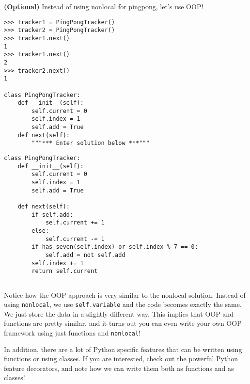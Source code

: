 \question \textbf{(Optional)} Instead of using nonlocal for pingpong, let's use OOP!

\begin{nonsol}
\begin{lstlisting}
>>> tracker1 = PingPongTracker()
>>> tracker2 = PingPongTracker()
>>> tracker1.next()
1
>>> tracker1.next()
2
>>> tracker2.next()
1

class PingPongTracker:
    def __init__(self):
        self.current = 0
        self.index = 1
        self.add = True
    def next(self):
        """*** Enter solution below ***"""
\end{lstlisting}
\end{nonsol}

\begin{solution}[0.3in]
\begin{lstlisting}
class PingPongTracker:
    def __init__(self):
        self.current = 0
        self.index = 1
        self.add = True

    def next(self):
        if self.add:
            self.current += 1
        else:
            self.current -= 1
        if has_seven(self.index) or self.index % 7 == 0:
            self.add = not self.add
        self.index += 1
        return self.current


\end{lstlisting}
Notice how the OOP approach is very similar to the nonlocal solution.
Instead of using \texttt{nonlocal}, we use \texttt{self.variable} and the code
becomes exactly the same. We just store the data in a slightly different way.
This implies that OOP and functions are pretty similar, and it turns out you can
even write your own OOP framework using just functions and \texttt{nonlocal}!

In addition, there are a lot of Python specific features that can be written
using functions or using classes. If you are interested, check out the powerful
Python feature decorators, and note how we can write them both as functions and
as classes!
\end{solution}
